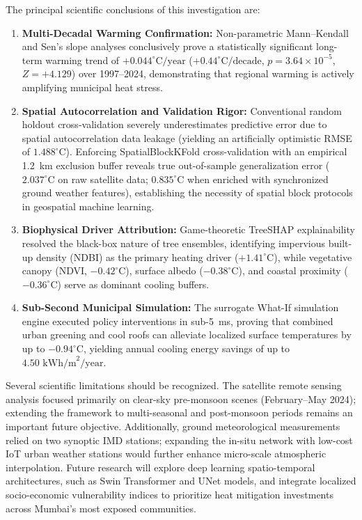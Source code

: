 \documentclass[a4paper,fleqn]{cas-sc}
\begin{document}
The principal scientific conclusions of this investigation are:
\begin{enumerate}[1.]
    \item \textbf{Multi-Decadal Warming Confirmation:} Non-parametric Mann--Kendall and Sen's slope analyses conclusively prove a statistically significant long-term warming trend of $+0.044^\circ\text{C}/\text{year}$ ($+0.44^\circ\text{C}/\text{decade}$, $p = 3.64 \times 10^{-5}$, $Z = +4.129$) over 1997--2024, demonstrating that regional warming is actively amplifying municipal heat stress.
    \item \textbf{Spatial Autocorrelation and Validation Rigor:} Conventional random holdout cross-validation severely underestimates predictive error due to spatial autocorrelation data leakage (yielding an artificially optimistic RMSE of $1.488^\circ\text{C}$). Enforcing SpatialBlockKFold cross-validation with an empirical 1.2~km exclusion buffer reveals true out-of-sample generalization error ($2.037^\circ\text{C}$ on raw satellite data; $0.835^\circ\text{C}$ when enriched with synchronized ground weather features), establishing the necessity of spatial block protocols in geospatial machine learning.
    \item \textbf{Biophysical Driver Attribution:} Game-theoretic TreeSHAP explainability resolved the black-box nature of tree ensembles, identifying impervious built-up density (NDBI) as the primary heating driver ($+1.41^\circ\text{C}$), while vegetative canopy (NDVI, $-0.42^\circ\text{C}$), surface albedo ($-0.38^\circ\text{C}$), and coastal proximity ($-0.36^\circ\text{C}$) serve as dominant cooling buffers.
    \item \textbf{Sub-Second Municipal Simulation:} The surrogate What-If simulation engine executed policy interventions in sub-5~ms, proving that combined urban greening and cool roofs can alleviate localized surface temperatures by up to $-0.94^\circ\text{C}$, yielding annual cooling energy savings of up to $4.50\text{ kWh/m}^2/\text{year}$.
\end{enumerate}

Several scientific limitations should be recognized. The satellite remote sensing analysis focused primarily on clear-sky pre-monsoon scenes (February--May 2024); extending the framework to multi-seasonal and post-monsoon periods remains an important future objective. Additionally, ground meteorological measurements relied on two synoptic IMD stations; expanding the in-situ network with low-cost IoT urban weather stations would further enhance micro-scale atmospheric interpolation. Future research will explore deep learning spatio-temporal architectures, such as Swin Transformer and UNet models, and integrate localized socio-economic vulnerability indices to prioritize heat mitigation investments across Mumbai's most exposed communities.
\end{document}
